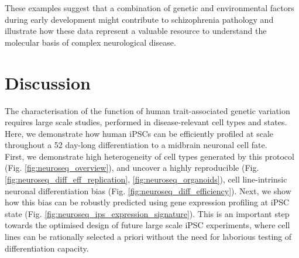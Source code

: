 \newpage

These examples suggest that a combination of genetic and environmental factors during early development might contribute to schizophrenia pathology and illustrate how these data represent a valuable resource to understand the molecular basis of complex neurological disease.

\clearpage

\section{Discussion}
\label{sec:neuroseq_discussion}





The characterisation of the function of human trait-associated genetic variation requires large scale studies, performed in disease-relevant cell types and states. 
Here, we demonstrate how human iPSCs can be efficiently profiled at scale throughout a 52 day-long differentiation to a midbrain neuronal cell fate. \\

First, we demonstrate high heterogeneity of cell types generated by this protocol (Fig. \ref{fig:neuroseq_overview}), and uncover a highly reproducible (Fig. \ref{fig:neuroseq_diff_eff_replication}, \ref{fig:neuroseq_organoids}), cell line-intrinsic neuronal differentiation bias (Fig. \ref{fig:neuroseq_diff_efficiency}).
Next, we show how this bias can be robustly predicted using gene expression profiling at iPSC state (Fig. \ref{fig:neuroseq_ips_expression_signature}). 
This is an important step towards the optimised design of future large scale iPSC experiments, where cell lines can be rationally selected a priori without the need for laborious testing of differentiation capacity. \\

